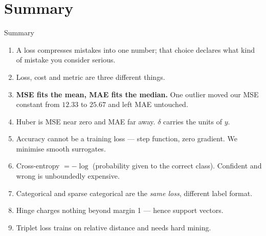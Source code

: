 \documentclass[aspectratio=169]{beamer}
\begin{document}
\section{Summary}
\label{sec:summary}

\begin{frame}[shrink=5]{Summary}
  \begin{enumerate}\small
    \item A loss compresses mistakes into one number; that choice declares
      what kind of mistake you consider serious.
    \item Loss, cost and metric are three different things.
    \item \textbf{MSE fits the mean, MAE fits the median.} One outlier moved
      our MSE constant from $12.33$ to $25.67$ and left MAE untouched.
    \item Huber is MSE near zero and MAE far away. $\delta$ carries the units
      of $y$.
    \item Accuracy cannot be a training loss --- step function, zero gradient.
      We minimise smooth surrogates.
    \item Cross-entropy $= -\log$ (probability given to the correct class).
      Confident and wrong is unboundedly expensive.
    \item Categorical and sparse categorical are the \emph{same loss},
      different label format.
    \item Hinge charges nothing beyond margin 1 --- hence support vectors.
    \item Triplet loss trains on relative distance and needs hard mining.
  \end{enumerate}
\end{frame}
\end{document}
